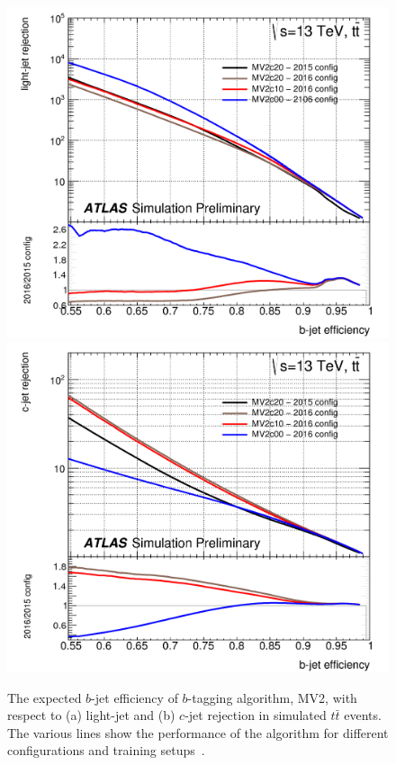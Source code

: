 \begin{figure}[!ht]
  \begin{center}
    \captionsetup[subfigure]{aboveskip=0pt,justification=centering}
    \subcaptionbox{} {\includegraphics[width=0.48\linewidth, angle=0]{figs/Objects/bjets_perf_light}}
    \subcaptionbox{} { \includegraphics[width=0.48\linewidth, angle=0]{figs/Objects/bjets_perf_charm}}
  \end{center}
  \caption[The expected $b$-jet efficiency of $b$-tagging algorithm, MV2, with respect to
    (a) light-jet and (b) $c$-jet rejection in simulated $t\bar{t}$ events.
    The various lines show the performance of the algorithm for different configurations and training setups.]
    {The expected $b$-jet efficiency of $b$-tagging algorithm, MV2, with respect to
    (a) light-jet and (b) $c$-jet rejection in simulated $t\bar{t}$ events.
    The various lines show the performance of the algorithm for different configurations and training setups~\cite{obj-bjets_algo_2016}.}
  \label{fig:obj-bjets_perf}
\end{figure}

